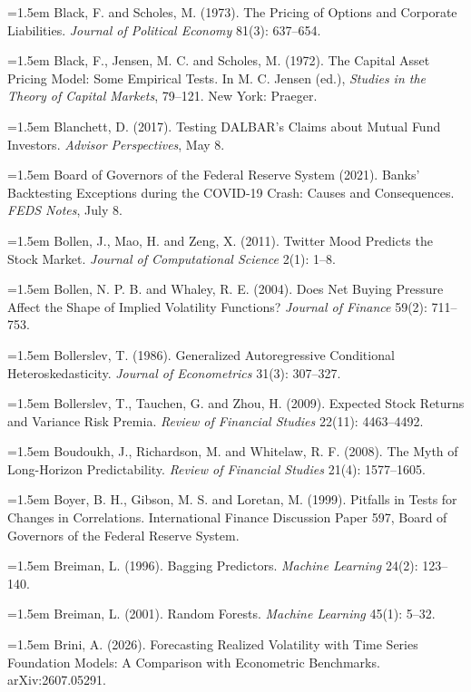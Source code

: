 \hangindent=1.5em Black, F. and Scholes, M. (1973). The Pricing of Options and Corporate Liabilities. \emph{Journal of Political Economy} 81(3): 637--654.

\hangindent=1.5em Black, F., Jensen, M. C. and Scholes, M. (1972). The Capital Asset Pricing Model: Some Empirical Tests. In M. C. Jensen (ed.), \emph{Studies in the Theory of Capital Markets}, 79--121. New York: Praeger.

\hangindent=1.5em Blanchett, D. (2017). Testing DALBAR's Claims about Mutual Fund Investors. \emph{Advisor Perspectives}, May 8.

\hangindent=1.5em Board of Governors of the Federal Reserve System (2021). Banks' Backtesting Exceptions during the COVID-19 Crash: Causes and Consequences. \emph{FEDS Notes}, July 8.

\hangindent=1.5em Bollen, J., Mao, H. and Zeng, X. (2011). Twitter Mood Predicts the Stock Market. \emph{Journal of Computational Science} 2(1): 1--8.

\hangindent=1.5em Bollen, N. P. B. and Whaley, R. E. (2004). Does Net Buying Pressure Affect the Shape of Implied Volatility Functions? \emph{Journal of Finance} 59(2): 711--753.

\hangindent=1.5em Bollerslev, T. (1986). Generalized Autoregressive Conditional Heteroskedasticity. \emph{Journal of Econometrics} 31(3): 307--327.

\hangindent=1.5em Bollerslev, T., Tauchen, G. and Zhou, H. (2009). Expected Stock Returns and Variance Risk Premia. \emph{Review of Financial Studies} 22(11): 4463--4492.

\hangindent=1.5em Boudoukh, J., Richardson, M. and Whitelaw, R. F. (2008). The Myth of Long-Horizon Predictability. \emph{Review of Financial Studies} 21(4): 1577--1605.

\hangindent=1.5em Boyer, B. H., Gibson, M. S. and Loretan, M. (1999). Pitfalls in Tests for Changes in Correlations. International Finance Discussion Paper 597, Board of Governors of the Federal Reserve System.

\hangindent=1.5em Breiman, L. (1996). Bagging Predictors. \emph{Machine Learning} 24(2): 123--140.

\hangindent=1.5em Breiman, L. (2001). Random Forests. \emph{Machine Learning} 45(1): 5--32.

\hangindent=1.5em Brini, A. (2026). Forecasting Realized Volatility with Time Series Foundation Models: A Comparison with Econometric Benchmarks. arXiv:2607.05291.

